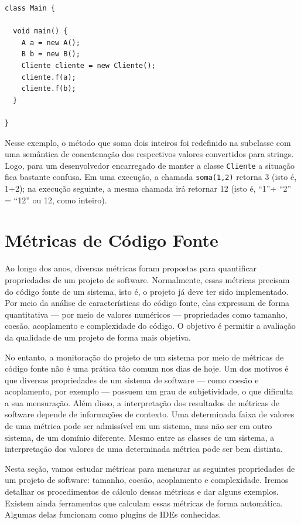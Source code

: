 \documentclass[
  11pt,
  twoside]{book}
\newcommand{\passthrough}[1]{#1}
\begin{document}
\begin{lstlisting}
class Main {

  void main() {
    A a = new A();
    B b = new B();
    Cliente cliente = new Cliente();
    cliente.f(a);
    cliente.f(b);
  }

}
\end{lstlisting}

Nesse exemplo, o método que soma dois inteiros foi redefinido na
subclasse com uma semântica de concatenação dos respectivos valores
convertidos para strings. Logo, para um desenvolvedor encarregado de
manter a classe \passthrough{\lstinline!Cliente!} a situação fica
bastante confusa. Em uma execução, a chamada
\passthrough{\lstinline!soma(1,2)!} retorna 3 (isto é, 1+2); na execução
seguinte, a mesma chamada irá retornar 12 (isto é, ``1''+ ``2'' = ``12''
ou 12, como inteiro).

\hypertarget{muxe9tricas-de-cuxf3digo-fonte}{%
\section{Métricas de Código
Fonte}\label{muxe9tricas-de-cuxf3digo-fonte}}


Ao longo dos anos, diversas métricas foram propostas para quantificar
propriedades de um projeto de software. Normalmente, essas métricas
precisam do código fonte de um sistema, isto é, o projeto já deve ter
sido implementado. Por meio da análise de características do código
fonte, elas expressam de forma quantitativa --- por meio de valores
numéricos --- propriedades como tamanho, coesão, acoplamento e
complexidade do código. O objetivo é permitir a avaliação da qualidade
de um projeto de forma mais objetiva.

No entanto, a monitoração do projeto de um sistema por meio de métricas
de código fonte não é uma prática tão comum nos dias de hoje. Um dos
motivos é que diversas propriedades de um sistema de software --- como
coesão e acoplamento, por exemplo --- possuem um grau de subjetividade,
o que dificulta a sua mensuração. Além disso, a interpretação dos
resultados de métricas de software depende de informações de contexto.
Uma determinada faixa de valores de uma métrica pode ser admissível em
um sistema, mas não ser em outro sistema, de um domínio diferente. Mesmo
entre as classes de um sistema, a interpretação dos valores de uma
determinada métrica pode ser bem distinta.

Nesta seção, vamos estudar métricas para mensurar as seguintes
propriedades de um projeto de software: tamanho, coesão, acoplamento e
complexidade. Iremos detalhar os procedimentos de cálculo dessas
métricas e dar alguns exemplos. Existem ainda ferramentas que calculam
essas métricas de forma automática. Algumas delas funcionam como plugins
de IDEs conhecidas.
\end{document}

